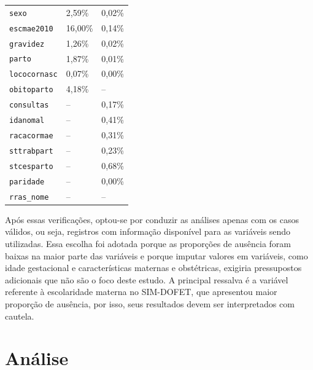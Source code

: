 \begin{table}[H]
\begin{tabular}{@{} L{4cm} C{4cm} C{4cm} @{}}
        \texttt{sexo}        & 2,59\%  & 0,02\%  \\
        \texttt{escmae2010}  & 16,00\% & 0,14\%  \\
        \texttt{gravidez}    & 1,26\%  & 0,02\%  \\
        \texttt{parto}       & 1,87\%  & 0,01\%  \\
        \texttt{lococornasc} & 0,07\%  & 0,00\%  \\
        \texttt{obitoparto}  & 4,18\%  & --      \\
        \texttt{consultas}   & --      & 0,17\%  \\
        \texttt{idanomal}    & --      & 0,41\%  \\
        \texttt{racacormae}  & --      & 0,31\%  \\
        \texttt{sttrabpart}  & --      & 0,23\%  \\
        \texttt{stcesparto}  & --      & 0,68\%  \\
        \texttt{paridade}    & --      & 0,00\%  \\
        \texttt{rras\_nome}  & --      & --      \\
        
        \bottomrule
    \end{tabular}
    
    \vspace{2pt}
    \label{fig:tabela-dados-faltantes}
\end{table}

Após essas verificações, optou-se por conduzir as análises apenas com os casos 
válidos, ou seja, registros com informação disponível para as variáveis sendo 
utilizadas. Essa escolha foi adotada porque as proporções de ausência foram baixas 
na maior parte das variáveis e porque imputar valores em variáveis, como idade 
gestacional e características maternas e obstétricas, exigiria pressupostos 
adicionais que não são o foco deste estudo. A principal ressalva é a variável 
referente à escolaridade materna no SIM-DOFET, que apresentou maior proporção de 
ausência, por isso, seus resultados devem ser interpretados com cautela.

\section{Análise}

